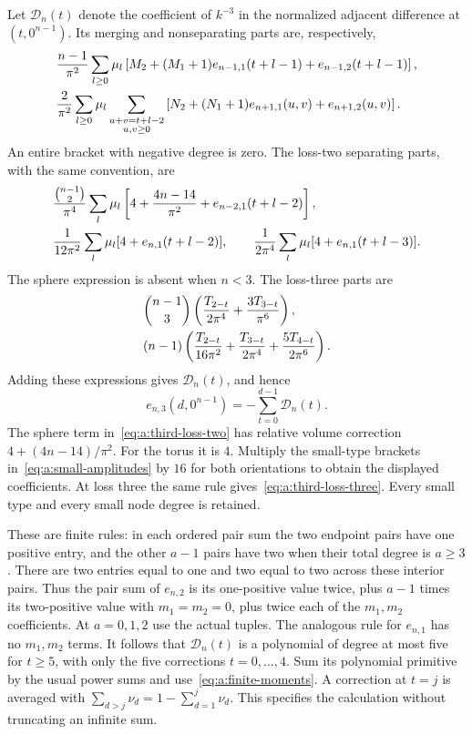 Let $\mathcal D_n(t)$ denote the coefficient of $k^{-3}$ in the normalized
adjacent difference at $(t,0^{n-1})$. Its merging and nonseparating
parts are, respectively,
\begin{align}
 &\frac{n-1}{\pi^2}\sum_{l\geq0}\mu_l
 \left[M_2+(M_1+1)e_{n-1,1}(t+l-1)
                            +e_{n-1,2}(t+l-1)\right],\notag\\
 &\frac2{\pi^2}\sum_{l\geq0}\mu_l
 \sum_{\substack{u+v=t+l-2\\u,v\geq0}}
 \left[N_2+(N_1+1)e_{n+1,1}(u,v)+e_{n+1,2}(u,v)\right].
 \label{eq:a:third-merge-split}
\end{align}
An entire bracket with negative degree is zero. The loss-two separating
parts, with the same convention, are
\begin{align}
 &\frac{\binom{n-1}{2}}{\pi^4}\sum_l\mu_l
 \left[4+\frac{4n-14}{\pi^2}+e_{n-2,1}(t+l-2)\right],\notag\\
 &\frac1{12\pi^2}\sum_l\mu_l[4+e_{n,1}(t+l-2)],\qquad
 \frac1{2\pi^4}\sum_l\mu_l[4+e_{n,1}(t+l-3)].
 \label{eq:a:third-loss-two}
\end{align}
The sphere expression is absent when $n<3$. The loss-three parts are
\begin{align}
 &\binom{n-1}{3}\left(\frac{T_{2-t}}{2\pi^4}
                                      +\frac{3T_{3-t}}{\pi^6}\right),\notag\\
 &(n-1)\left(\frac{T_{2-t}}{16\pi^2}
             +\frac{T_{3-t}}{2\pi^4}+\frac{5T_{4-t}}{2\pi^6}\right).
 \label{eq:a:third-loss-three}
\end{align}
Adding these expressions gives $\mathcal D_n(t)$, and hence
\begin{equation}\label{eq:a:third-primitive}
 e_{n,3}(d,0^{n-1})=-\sum_{t=0}^{d-1}\mathcal D_n(t).
\end{equation}
The sphere term in~\eqref{eq:a:third-loss-two} has relative volume
correction $4+(4n-14)/\pi^2$. For the torus it is $4$. Multiply the
small-type brackets in~\eqref{eq:a:small-amplitudes} by $16$ for both
orientations to obtain the displayed coefficients. At loss three the
same rule gives~\eqref{eq:a:third-loss-three}. Every small type and
every small node degree is retained.

These are finite rules: in each ordered pair sum the two endpoint pairs
have one positive entry, and the other $a-1$ pairs have two when their
total degree is $a\geq3$. There are two entries equal to one and two
equal to two across these interior pairs. Thus the pair sum of
$e_{n,2}$ is its one-positive value twice, plus $a-1$ times its
two-positive value with $m_1=m_2=0$, plus twice each of the $m_1,m_2$
coefficients. At $a=0,1,2$ use the actual tuples. The analogous rule
for $e_{n,1}$ has no $m_1,m_2$ terms. It follows that $\mathcal D_n(t)$ is a
polynomial of degree at most five for $t\geq5$, with only the five
corrections $t=0,\ldots,4$. Sum its polynomial primitive by the usual
power sums and use~\eqref{eq:a:finite-moments}. A correction at $t=j$
is averaged with $\sum_{d>j}\nu_d=1-\sum_{d=1}^j\nu_d$.
This specifies the calculation without truncating an infinite sum.

